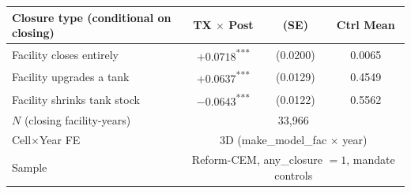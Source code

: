 \begin{tabular}{lccc}
\toprule
Closure type (conditional on closing) & TX $\times$ Post & (SE) & Ctrl Mean \\
\midrule
Facility closes entirely     & $+0.0718$\textsuperscript{***} & (0.0200) & 0.0065 \\
Facility upgrades a tank     & $+0.0637$\textsuperscript{***} & (0.0129) & 0.4549 \\
Facility shrinks tank stock  & $-0.0643$\textsuperscript{***} & (0.0122) & 0.5562 \\
\midrule
$N$ (closing facility-years) & \multicolumn{3}{c}{33{,}966} \\
Cell$\times$Year FE          & \multicolumn{3}{c}{3D (make\_model\_fac $\times$ year)} \\
Sample                       & \multicolumn{3}{c}{Reform-CEM, any\_closure $= 1$, mandate controls} \\
\bottomrule
\end{tabular}
